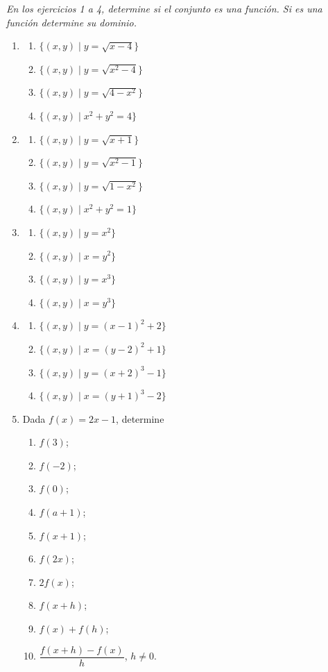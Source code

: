\documentclass[12pt]{article}
\theoremstyle{remark}
\begin{document}
\textit{En los ejercicios 1 a 4, determine si el conjunto es una función. Si es una función determine su dominio.}

\begin{enumerate}
\item
\begin{enumerate}[label=(\alph*)]
\item $\{(x,y)\mid y=\sqrt{x-4}\}$
\item $\{(x,y)\mid y=\sqrt{x^2-4}\}$
\item $\{(x,y)\mid y=\sqrt{4-x^2}\}$
\item $\{(x,y)\mid x^2+y^2=4\}$
\end{enumerate}

\item
\begin{enumerate}[label=(\alph*)]
\item $\{(x,y)\mid y=\sqrt{x+1}\}$
\item $\{(x,y)\mid y=\sqrt{x^2-1}\}$
\item $\{(x,y)\mid y=\sqrt{1-x^2}\}$
\item $\{(x,y)\mid x^2+y^2=1\}$
\end{enumerate}

\item
\begin{enumerate}[label=(\alph*)]
\item $\{(x,y)\mid y=x^2\}$
\item $\{(x,y)\mid x=y^2\}$
\item $\{(x,y)\mid y=x^3\}$
\item $\{(x,y)\mid x=y^3\}$
\end{enumerate}

\item
\begin{enumerate}[label=(\alph*)]
\item $\{(x,y)\mid y=(x-1)^2+2\}$
\item $\{(x,y)\mid x=(y-2)^2+1\}$
\item $\{(x,y)\mid y=(x+2)^3-1\}$
\item $\{(x,y)\mid x=(y+1)^3-2\}$
\end{enumerate}

\item Dada $f(x)=2x-1$, determine
\begin{enumerate}[label=(\alph*)]
\item $f(3)$; \item $f(-2)$; \item $f(0)$; \item $f(a+1)$; \item $f(x+1)$;
\item $f(2x)$; \item $2f(x)$; \item $f(x+h)$; \item $f(x)+f(h)$;
\item $\dfrac{f(x+h)-f(x)}{h}$, $h\ne0$.
\end{enumerate}


\end{enumerate}
\end{document}
